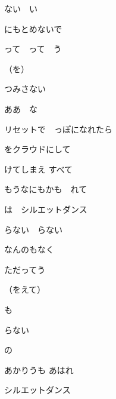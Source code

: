 \documentclass[a4paper,tate,twocolumn,12pt]{ltjtarticle}
\begin{document}
\begin{flushleft}
\begin{minipage}{\linewidth}
ない　い


にもとめないで

って　って　う

（を）

つみさない

ああ　な

リセットで　っぽになれたら
\end{minipage}

\vspace{2em}

\noindent\begin{minipage}{\linewidth}
をクラウドにして

けてしまえ すべて
\end{minipage}

\vspace{2em}

\noindent\begin{minipage}{\linewidth}
もうなにもかも　れて

は　シルエットダンス

らない　らない


なんのもなく

ただってう

（をえて）

も

らない

の

あかりうも あはれ

シルエットダンス
\end{minipage}

\end{flushleft}
\end{document}
